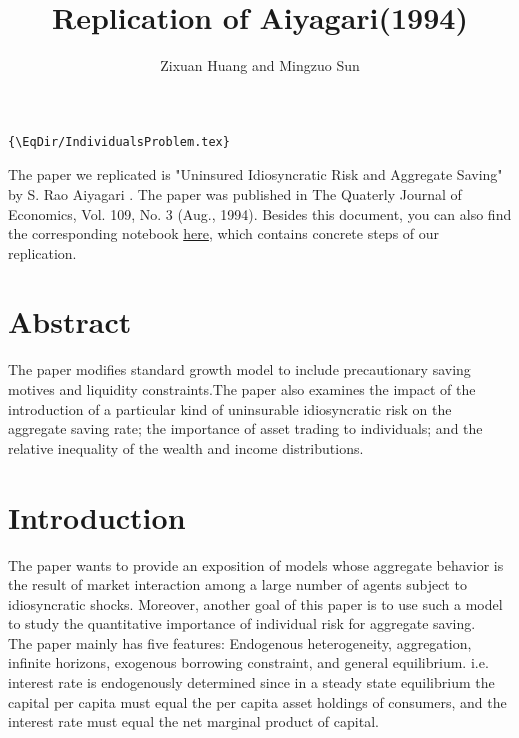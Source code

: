 \documentclass[]{article}
\title{Replication of Aiyagari(1994)}
\author{Zixuan Huang and Mingzuo Sun}
\date{}
\providecommand{\EqDir}{Equations}
\providecommand{\RefDir}{References}
\begin{document}
\linespread{2}
\maketitle

\begin{verbatim}{\EqDir/IndividualsProblem.tex}
\end{verbatim}


The paper we replicated is "Uninsured Idiosyncratic Risk and Aggregate Saving" by S. Rao Aiyagari \cite{\RefDir/ref/aiyagari_1994}. The paper was published in The Quaterly Journal of Economics, Vol. 109, No. 3 (Aug., 1994). Besides this document, you can also find the corresponding notebook \href{run:../Aiyagari1994QJE.ipynb}{here}, which contains concrete steps of our replication.

\section{Abstract}
The paper modifies standard growth model to include precautionary saving motives and liquidity constraints.The paper also examines the impact of the introduction of a particular kind of uninsurable idiosyncratic risk on the aggregate saving rate; the importance of asset trading to individuals; and the relative inequality of the wealth and income distributions. 

\section{Introduction}
The paper wants to provide an exposition of models whose aggregate behavior is the result of market interaction among a large number of agents subject to idiosyncratic shocks. Moreover, another goal of this paper is to use such a model to study the quantitative importance of individual risk for aggregate saving.\\

The paper mainly has five features: Endogenous heterogeneity, aggregation, infinite horizons, exogenous borrowing constraint, and general equilibrium. i.e. interest rate is endogenously determined since in a steady state equilibrium the capital per capita must equal the per capita asset holdings of consumers, and the interest rate must equal the net marginal product of capital. 
\end{document}
